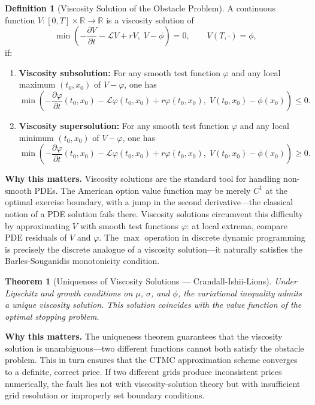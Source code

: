 \documentclass[11pt,a4paper,openany]{book}
\theoremstyle{definition}
\newtheorem{definition}{Definition}[chapter]
\theoremstyle{plain}
\newtheorem{theorem}{Theorem}[chapter]
\theoremstyle{remark}
\newcommand{\1}{\mathbbm{1}}
\newcommand{\R}{\mathbb{R}}
\newcommand{\calL}{\mathcal{L}}
\begin{document}
\begin{definition}[Viscosity Solution of the Obstacle Problem]
A continuous function $V: [0,T] \times \R \to \R$ is a viscosity solution of
\[
\min\left(-\frac{\partial V}{\partial t} - \calL V + rV, \; V - \phi\right) = 0, \qquad V(T, \cdot) = \phi,
\]
if:
\begin{enumerate}[label=(\arabic*)]
    \item \textbf{Viscosity subsolution:} For any smooth test function $\varphi$ and any local maximum $(t_{0}, x_{0})$ of $V - \varphi$, one has
    \[
    \min\left(-\frac{\partial \varphi}{\partial t}(t_{0}, x_{0}) - \calL \varphi(t_{0}, x_{0}) + r \varphi(t_{0}, x_{0}), \; V(t_{0}, x_{0}) - \phi(x_{0})\right) \leq 0.
    \]
    \item \textbf{Viscosity supersolution:} For any smooth test function $\varphi$ and any local minimum $(t_{0}, x_{0})$ of $V - \varphi$, one has
    \[
    \min\left(-\frac{\partial \varphi}{\partial t}(t_{0}, x_{0}) - \calL \varphi(t_{0}, x_{0}) + r \varphi(t_{0}, x_{0}), \; V(t_{0}, x_{0}) - \phi(x_{0})\right) \geq 0.
    \]
\end{enumerate}
\end{definition}

\medskip
\noindent\textbf{Why this matters.} Viscosity solutions are the standard tool for handling non-smooth PDEs. The American option value function may be merely $C^1$ at the optimal exercise boundary, with a jump in the second derivative---the classical notion of a PDE solution fails there. Viscosity solutions circumvent this difficulty by approximating $V$ with smooth test functions $\varphi$: at local extrema, compare PDE residuals of $V$ and $\varphi$. The $\max$ operation in discrete dynamic programming is precisely the discrete analogue of a viscosity solution---it naturally satisfies the Barles-Souganidis monotonicity condition.

\begin{theorem}[Uniqueness of Viscosity Solutions --- Crandall-Ishii-Lions]
Under Lipschitz and growth conditions on $\mu$, $\sigma$, and $\phi$, the variational inequality admits a unique viscosity solution. This solution coincides with the value function of the optimal stopping problem.
\end{theorem}

\medskip
\noindent\textbf{Why this matters.} The uniqueness theorem guarantees that the viscosity solution is unambiguous---two different functions cannot both satisfy the obstacle problem. This in turn ensures that the CTMC approximation scheme converges to a definite, correct price. If two different grids produce inconsistent prices numerically, the fault lies not with viscosity-solution theory but with insufficient grid resolution or improperly set boundary conditions.
\end{document}
